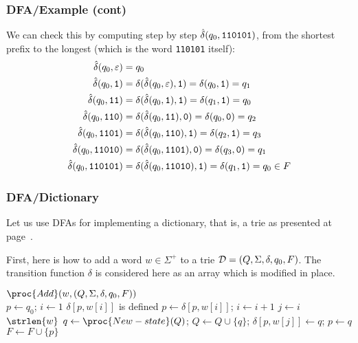 % 
\begin{frame}[containsverbatim]
\frametitle{DFA/Example (cont)}

We can check this by computing step by step
\(\hat{\delta}(q_0,\verb+110101+)\), from the shortest prefix to the
longest (which is the word \verb+110101+ itself):
\[
\begin{aligned}
  \hat{\delta} (q_0, \varepsilon) 
&= q_0\\
   \hat{\delta} (q_0, \verb+1+) 
&= \delta (\hat{\delta} (q_0, \varepsilon), \verb+1+) 
= \delta (q_0, \verb+1+)
= q_1\\
   \hat{\delta} (q_0, \verb+11+) 
&= \delta (\hat{\delta} (q_0, \verb+1+), \verb+1+) 
= \delta (q_1, \verb+1+) 
= q_0\\
   \hat{\delta} (q_0, \verb+110+) 
&= \delta (\hat{\delta} (q_0, \verb+11+), \verb+0+) 
= \delta (q_0, \verb+0+) 
= q_2\\
   \hat{\delta} (q_0, \verb+1101+) 
&= \delta (\hat{\delta} (q_0, \verb+110+), \verb+1+) 
= \delta (q_2, \verb+1+) 
= q_3\\
   \hat{\delta} (q_0, \verb+11010+) 
&= \delta (\hat{\delta} (q_0, \verb+1101+), \verb+0+) 
= \delta (q_3, \verb+0+) 
= q_1\\
   \hat{\delta} (q_0, \verb+110101+) 
&= \delta (\hat{\delta} (q_0, \verb+11010+), \verb+1+) 
= \delta (q_1, \verb+1+) 
= q_0 \in F
\end{aligned}
\]

\end{frame}

% 
\begin{frame}
\frametitle{DFA/Dictionary}
 
Let us use DFAs for implementing a dictionary, that is, a trie as
presented at page~\pageref{trie_then}.

\bigskip
First, here is how to add a word \(w \in \Sigma^{+}\) to a trie
\({\cal D} = (Q, \Sigma, \delta, q_0, F)\). The transition function
\(\delta\) is considered here as an array which is modified in place.
\begin{codebox}
\(\proc{Add} (w, (Q, \Sigma, \delta, q_0, F))\)\\
\li \(p \gets q_0\); \(i \gets 1\)
\li \While \(\delta[p,w[i]]\) is defined
\li   \Do \(p \gets \delta[p,w[i]]\); \(i \gets i + 1\)
      \End
\li \For \(j \gets i\) \To \(\strlen{w}\)
\li \Do \(q \gets \proc{New-state}(Q)\);
     \(Q \gets Q \cup \{q\}\);
     \(\delta[p, w[j]] \gets q\);
     \(p \gets q\)
    \End
\li  \(F \gets F \cup \{p\}\)
\end{codebox}

\end{frame}
